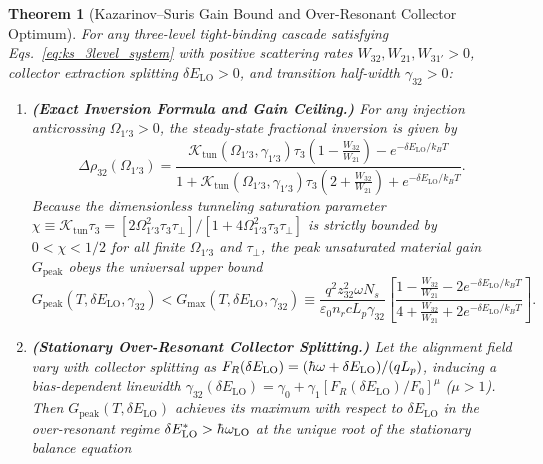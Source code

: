 \documentclass[11pt,letterpaper]{article}
\renewcommand{\hbar}{\mathchar'26\mkern-9mu h}
\newtheorem{theorem}{Theorem}
\begin{document}
\begin{theorem}[Kazarinov--Suris Gain Bound and Over-Resonant Collector Optimum]
\label{thm:ks_bound}
For any three-level tight-binding cascade satisfying Eqs.~\eqref{eq:ks_3level_system} with positive scattering rates $W_{32}, W_{21}, W_{31'} > 0$, collector extraction splitting $\delta E_{\mathrm{LO}} > 0$, and transition half-width $\gamma_{32} > 0$:
\begin{enumerate}
    \item[(a)] \textbf{(Exact Inversion Formula and Gain Ceiling.)} For any injection anticrossing $\Omega_{1'3} > 0$, the steady-state fractional inversion is given by
    \begin{equation}
    \Delta\rho_{32}(\Omega_{1'3}) = \frac{\mathcal{K}_{\mathrm{tun}}(\Omega_{1'3}, \gamma_{1'3})\tau_3\left(1 - \frac{W_{32}}{W_{21}}\right) - e^{-\delta E_{\mathrm{LO}}/k_B T}}{1 + \mathcal{K}_{\mathrm{tun}}(\Omega_{1'3}, \gamma_{1'3})\tau_3\left(2 + \frac{W_{32}}{W_{21}}\right) + e^{-\delta E_{\mathrm{LO}}/k_B T}}.
    \label{eq:thm2_inversion}
    \end{equation}
    Because the dimensionless tunneling saturation parameter $\chi \equiv \mathcal{K}_{\mathrm{tun}}\tau_3 = [2\Omega_{1'3}^2 \tau_3 \tau_\perp] / [1 + 4\Omega_{1'3}^2 \tau_3 \tau_\perp]$ is strictly bounded by $0 < \chi < 1/2$ for all finite $\Omega_{1'3}$ and $\tau_\perp$, the peak unsaturated material gain $G_{\mathrm{peak}}$ obeys the universal upper bound
    \begin{equation}
    G_{\mathrm{peak}}(T, \delta E_{\mathrm{LO}}, \gamma_{32}) < G_{\max}(T, \delta E_{\mathrm{LO}}, \gamma_{32}) \equiv \frac{q^2 z_{32}^2 \omega N_s}{\varepsilon_0 n_r c L_p \gamma_{32}} \left[ \frac{1 - \frac{W_{32}}{W_{21}} - 2 e^{-\delta E_{\mathrm{LO}}/k_B T}}{4 + \frac{W_{32}}{W_{21}} + 2 e^{-\delta E_{\mathrm{LO}}/k_B T}} \right].
    \label{eq:thm2_gain_bound}
    \end{equation}
    \item[(b)] \textbf{(Stationary Over-Resonant Collector Splitting.)} Let the alignment field vary with collector splitting as $F_R(\delta E_{\mathrm{LO}}) = (\hbar\omega + \delta E_{\mathrm{LO}})/(q L_p)$, inducing a bias-dependent linewidth $\gamma_{32}(\delta E_{\mathrm{LO}}) = \gamma_0 + \gamma_1 [F_R(\delta E_{\mathrm{LO}})/F_0]^\mu$ ($\mu > 1$). Then $G_{\mathrm{peak}}(T, \delta E_{\mathrm{LO}})$ achieves its maximum with respect to $\delta E_{\mathrm{LO}}$ in the over-resonant regime $\delta E_{\mathrm{LO}}^* > \hbar\omega_{\mathrm{LO}}$ at the unique root of the stationary balance equation

\end{enumerate}
\end{theorem}
\end{document}
